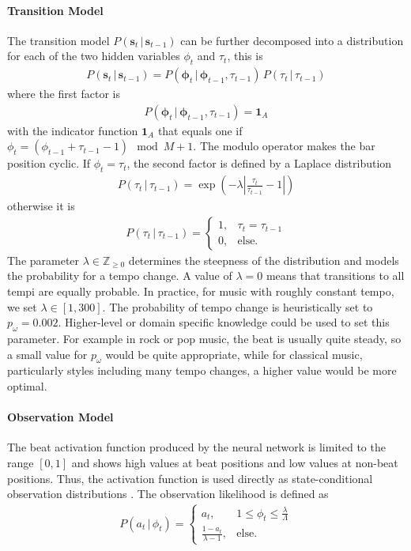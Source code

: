 \documentclass{scrartcl}
\begin{document}
\paragraph{Transition Model} The transition model $P(\mathbf s_t\,|\,\mathbf s_{t-1})$ can be further decomposed into a distribution for each of the two hidden variables $\phi_t$ and $\tau_t$, this is
\begin{align}
P(\mathbf s_t\,|\,\mathbf s_{t-1}) = P(\mathbf \phi_t\,|\,\mathbf \phi_{t-1}, \tau_{t-1}) \, P(\tau_t \, |\, \tau_{t-1}) 
\end{align} 
where the first factor is
\begin{align}
P(\mathbf \phi_t\,|\,\mathbf \phi_{t-1}, \tau_{t-1}) = \mathbf 1_A
\end{align} 
with the indicator function $\mathbf 1_A$ that equals one if $\phi_t = (\phi_{t-1}+\tau_{t-1}-1)\mod M+1$. The modulo operator makes the bar position cyclic. If $\phi_t = \tau_t$, the second factor is defined by a Laplace distribution
\begin{align}
P(\tau_t \, |\, \tau_{t-1}) = \exp \left( -\lambda \left| \frac{\tau_{t}}{\tau_{t-1}} -1 \right| \right)
\end{align} 
otherwise it is
\begin{align}
P(\tau_t \, |\, \tau_{t-1}) = \begin{cases}
    1, &\tau_t = \tau_{t-1}\\
    0, &\text{else.} 
\end{cases}
\end{align} 
The parameter $\lambda \in \mathbb Z_{\geq0}$ determines the steepness of the distribution and models the probability for a tempo change. A value of $\lambda = 0$ means that transitions to all tempi are equally probable. In practice, for music with roughly constant tempo, we set $\lambda \in [1, 300]$. The probability of tempo change is heuristically set to $p_\omega = 0.002$. Higher-level or domain specific knowledge could be used to set this parameter. For example in rock or pop music, the beat is usually quite steady, so a small value for $p_\omega$ would be quite appropriate, while for classical music, particularly styles including many tempo changes, a higher value would be more optimal.


\paragraph{Observation Model}
The beat activation function produced by the neural network is limited to the range $[0, 1]$ and shows high values at beat positions and low values at non-beat positions. Thus, the activation function is used directly as state-conditional observation distributions \cite{Degara2012}. The observation likelihood is defined as 
\begin{align}
P(a_t\,|\,\phi_t) = \begin{cases}
    a_t, &1 \leq \phi_t\leq \frac{\lambda}{\Lambda}\\
    \frac{1-a_t}{\lambda-1}, &\text{else}.    
\end{cases}
\end{align} 
\end{document}

